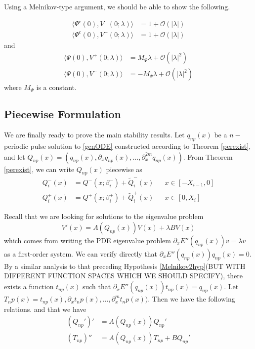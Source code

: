 \documentclass[thesis.tex]{subfiles}
\begin{document}
Using a Melnikov-type argument, we should be able to show the following.

\begin{lemma}\label{Vpmlambdalemma}
\begin{align*}
\langle \Psi^c(0), V^+(0; \lambda) \rangle &= 1 + \mathcal{O}(|\lambda|) \\
\langle \Psi^c(0), V^-(0; \lambda) \rangle &= 1 + \mathcal{O}(|\lambda|) 
\end{align*}
and
\begin{align*}
\langle \Psi(0), V^+(0; \lambda) \rangle &= M_\Psi \lambda + \mathcal{O}(|\lambda|^2) \\
\langle \Psi(0), V^-(0; \lambda) \rangle &= -M_\Psi \lambda + \mathcal{O}(|\lambda|^2) 
\end{align*}
where $M_\Psi$ is a constant.
\end{lemma}

\subsection{Piecewise Formulation}

We are finally ready to prove the main stability results. Let $q_{np}(x)$ be a $n-$periodic pulse solution to \eqref{genODE} constructed according to Theorem \ref{perexist}, and let $Q_{np}(x) = (q_{np}(x), \partial_x q_{np}(x), \dots, \partial_x^{2m} q_{np}(x) )$. From Theorem \ref{perexist}, we can write $Q_{np}(x)$ piecewise as
\begin{equation}\label{Qnppiece}
\begin{aligned}
Q_i^-(x) &= Q^-(x; \beta_i^-) + \tilde{Q}_i^-(x) && x \in [-X_{i-1}, 0] \\
Q_i^+(x) &= Q^+(x; \beta_i^+) + \tilde{Q}_i^+(x) && x \in [0, X_i]
\end{aligned}
\end{equation}

Recall that we are looking for solutions to the eigenvalue problem 
\begin{equation}\label{PDEeig4}
V'(x) = A(Q_{np}(x))V(x) + \lambda B V(x)
\end{equation}
which comes from writing the PDE eigenvalue problem $\partial_x E''(q_{np}(x)) v = \lambda v$ as a first-order system. We can verify directly that $\partial_x E''(q_{np}(x)) q_{np}(x) = 0$. By a similar analysis to that preceding Hypothesis \ref{Melnikov2hyp}(BUT WITH DIFFERENT FUNCTION SPACES WHICH WE SHOULD SPECIFY), there exists a function $t_{np}(x)$ such that $\partial_x E''(q_{np}(x)) t_{np}(x) = q_{np}(x)$. Let $T_np(x) = t_{np}(x), \partial_x t_np(x), \dots, \partial_x^m t_np(x))$. Then we have the following relations.
and that we have
\begin{equation}\label{Arelations}
\begin{aligned}
(Q_{np}')' &= A(Q_{np}(x)) Q_{np}' \\
(T_{np})'' &= A(Q_{np}(x)) T_{np} + B Q_{np}' 
\end{aligned}
\end{equation}
\end{document}

